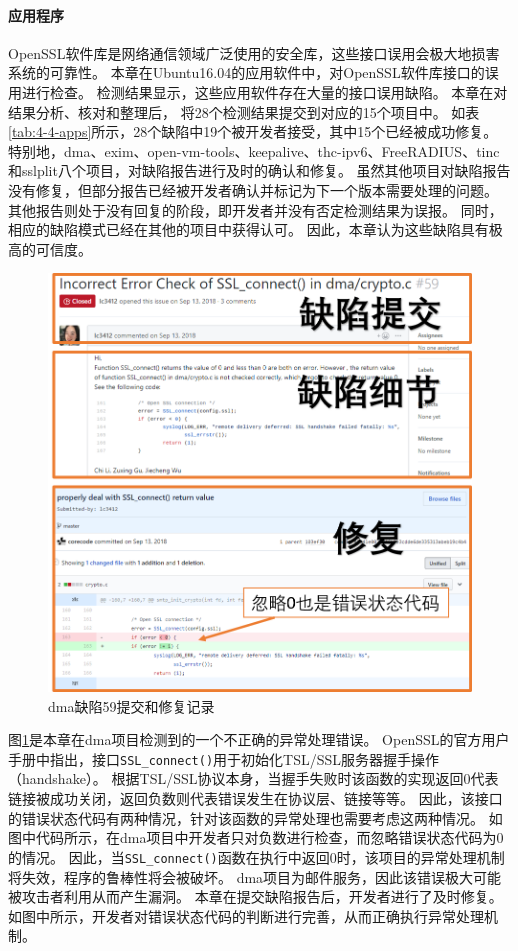 \paragraph{应用程序}



OpenSSL软件库是网络通信领域广泛使用的安全库，这些接口误用会极大地损害系统的可靠性。
本章在Ubuntu16.04的应用软件中，对OpenSSL软件库接口的误用进行检查。
检测结果显示，这些应用软件存在大量的接口误用缺陷。
本章在对结果分析、核对和整理后，
将28个检测结果提交到对应的15个项目中。
如表\ref{tab:4-4-apps}所示，28个缺陷中19个被开发者接受，其中15个已经被成功修复。
特别地，dma、exim、open-vm-tools、keepalive、thc-ipv6、FreeRADIUS、tinc和sslplit八个项目，对缺陷报告进行及时的确认和修复。
虽然其他项目对缺陷报告没有修复，但部分报告已经被开发者确认并标记为下一个版本需要处理的问题。
其他报告则处于没有回复的阶段，即开发者并没有否定检测结果为误报。
同时，相应的缺陷模式已经在其他的项目中获得认可。
因此，本章认为这些缺陷具有极高的可信度。

\begin{figure}[t]
	\centering
	\includegraphics[width=0.8\linewidth]{figures/cp4-dma-example.png}
	\caption{
		dma缺陷59提交和修复记录
	}
	\label{fig:4-4-dma-example}
\end{figure}

图\ref{fig:4-4-dma-example}是本章在dma项目检测到的一个不正确的异常处理错误。
OpenSSL的官方用户手册中指出，接口\texttt{SSL\_connect()}用于初始化TSL/SSL服务器握手操作（handshake）。
根据TSL/SSL协议本身，当握手失败时该函数的实现返回0代表链接被成功关闭，返回负数则代表错误发生在协议层、链接等等。
因此，该接口的错误状态代码有两种情况，针对该函数的异常处理也需要考虑这两种情况。
如图中代码所示，在dma项目中开发者只对负数进行检查，而忽略错误状态代码为0的情况。
因此，当\texttt{SSL\_connect()}函数在执行中返回0时，该项目的异常处理机制将失效，程序的鲁棒性将会被破坏。
dma项目为邮件服务，因此该错误极大可能被攻击者利用从而产生漏洞。
本章在提交缺陷报告后，开发者进行了及时修复。
如图中所示，开发者对错误状态代码的判断进行完善，从而正确执行异常处理机制。



